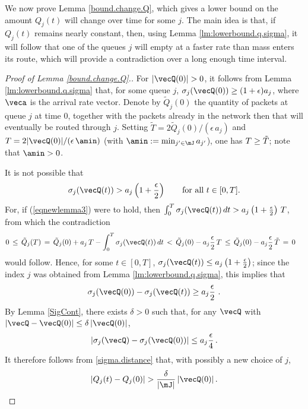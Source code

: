 \documentclass{amsart}
\begin{document}
We now prove Lemma \ref{bound.change.Q}, which gives a lower bound on the amount $Q_j(t)$ will change over time for some $j$. The main idea is that, if
$Q_j(t)$ remains nearly constant, then, using
Lemma \ref{lm:lowerbound.q.sigma}, it will follow that one of the queues $j$ will empty at a faster rate than mass enters its route, which will provide a contradiction over a long enough time interval. 

\begin{proof}[Proof of Lemma \ref{bound.change.Q}.]
For $|\vecQ(0)|>0$, it follows from  Lemma \ref{lm:lowerbound.q.sigma} that, for some queue $j$, 
$\sigma_{j}(\vecQ(0)) \ge  ( 1+ \epsilon) a_{j}$, where $\veca$ is the arrival rate vector.
Denote by $\tilde Q_{j}(0)$ the quantity of packets at queue $j$ at time $0$, together with the packets already in the network then
that will eventually be routed through $j$.
Setting $\tilde T = 2 \tilde Q_{j}(0) /(\epsilon \, a_{j})$ and $T = 2 |\vecQ(0)|/(\epsilon \, \amin)$ (with $\amin := \min_{j' \in \mJ} a_{j'}$), one has $T \geq \Tilde T$; note that $\amin > 0$. 

It is not possible that
\begin{equation}
\label{eqnewlemma3}
\sigma_{j}(\vecQ(t)) > a_{j} \left( 1+ \frac{\epsilon}{2} \right) \qquad \text{for all } t \in [0, T]. 
\end{equation}
For, if (\ref{eqnewlemma3}) were to hold, then
$\int_0^T  \sigma_{j}(\vecQ(t)) \, dt > a_{j} \left( 1+ \frac{\epsilon}{2} \right) \, T $,
from which the contradiction
\begin{align}
0 & \,\leq \, \tilde Q_{j}(T) 
  \, = \, \tilde Q_{j}(0) + a_{j} \, T - \int_0^T \sigma_{j}(\vecQ(t)) \, dt \nonumber  \,<\, \tilde Q_{j}(0) - a_{j}  \frac{\epsilon}{2}  \, T 
  \, \leq \, \tilde Q_{j}(0) - a_{j}  \frac{\epsilon}{2}  \, \tilde T \,=\, 0 \nonumber
\end{align}
would follow. Hence, for some $t \in [0, T]$,
$\sigma_{j}(\vecQ(t)) \leq a_{j} \left( 1+ \frac{\epsilon}{2} \right) $;
since the index $j$ was obtained from Lemma \ref{lm:lowerbound.q.sigma}, 
this implies that 
\begin{equation}\label{sigma.distance}
\sigma_{j}(\vecQ(0)) - \sigma_{j}(\vecQ(t)) \ge  a_{j} \frac{\epsilon}{2} \ . 
\end{equation}
By Lemma \ref{SigCont}, there exists $\delta > 0$ such that,
for any $\vecQ$ with $|\vecQ - \vecQ(0)| \leq \delta \, |\vecQ(0)|$, 
\begin{equation}
\label{eqafter53}
|\sigma_{j}(\vecQ) - \sigma_{j}(\vecQ(0))| \leq a_{j} \frac{\epsilon}{4}\,.
  \end{equation}
It therefore follows from \eqref{sigma.distance} that,
with possibly a new choice of $j$,
\begin{equation} \label{eq:delta}
| Q_j(t) - Q_j(0) | > \frac{\delta}{|\mJ|} \, |\vecQ(0)|\,.
\end{equation}
 

\end{proof}
\end{document}
